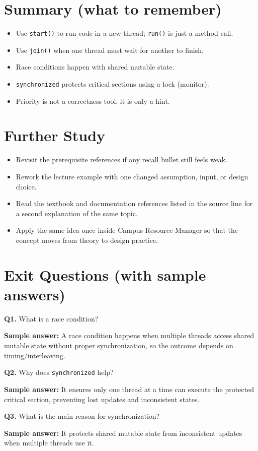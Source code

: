 \documentclass[11pt]{article}
\begin{document}
\section{Summary (what to remember)}
\begin{itemize}
  \item Use \texttt{start()} to run code in a new thread; \texttt{run()} is just a method call.
  \item Use \texttt{join()} when one thread must wait for another to finish.
  \item Race conditions happen with shared mutable state.
  \item \texttt{synchronized} protects critical sections using a lock (monitor).
  \item Priority is not a correctness tool; it is only a hint.
\end{itemize}

\section{Further Study}
\begin{itemize}
  \item Revisit the prerequisite references if any recall bullet still feels weak.
  \item Rework the lecture example with one changed assumption, input, or design choice.
  \item Read the textbook and documentation references listed in the source line for a second explanation of the same topic.
  \item Apply the same idea once inside Campus Resource Manager so that the concept moves from theory to design practice.
\end{itemize}
\notesources{\OOPSUnitIIISources}

\section{Exit Questions (with sample answers)}
\textbf{Q1.} What is a race condition?\par
\textbf{Sample answer:} A race condition happens when multiple threads access shared mutable state without proper synchronization, so the outcome depends on timing/interleaving.

\vspace{0.6em}
\textbf{Q2.} Why does \texttt{synchronized} help?\par
\textbf{Sample answer:} It ensures only one thread at a time can execute the protected critical section, preventing lost updates and inconsistent states.

\vspace{0.6em}
\textbf{Q3.} What is the main reason for synchronization?\par
\textbf{Sample answer:} It protects shared mutable state from inconsistent updates when multiple threads use it.
\end{document}
